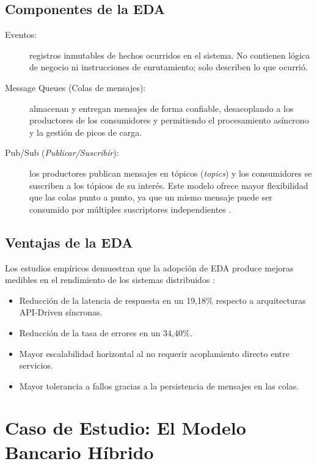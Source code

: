 \documentclass[12pt,a4paper]{article}
\begin{document}
\subsection{Componentes de la EDA}
 
\begin{description}
  \item[Eventos:] registros inmutables de hechos ocurridos en el sistema. No contienen lógica de negocio ni instrucciones de enrutamiento; solo describen lo que ocurrió.
  \item[Message Queues (Colas de mensajes):] almacenan y entregan mensajes de forma confiable, desacoplando a los productores de los consumidores y permitiendo el procesamiento asíncrono y la gestión de picos de carga.
  \item[Pub/Sub (\textit{Publicar/Suscribir}):] los productores publican mensajes en tópicos (\textit{topics}) y los consumidores se suscriben a los tópicos de su interés. Este modelo ofrece mayor flexibilidad que las colas punto a punto, ya que un mismo mensaje puede ser consumido por múltiples suscriptores independientes \cite{ref22}.
\end{description}
 
\subsection{Ventajas de la EDA}
 
Los estudios empíricos demuestran que la adopción de EDA produce mejoras medibles en el rendimiento de los sistemas distribuidos \cite{ref21}:
 
\begin{itemize}
  \item Reducción de la latencia de respuesta en un 19,18\% respecto a arquitecturas API-Driven síncronas.
  \item Reducción de la tasa de errores en un 34,40\%.
  \item Mayor escalabilidad horizontal al no requerir acoplamiento directo entre servicios.
  \item Mayor tolerancia a fallos gracias a la persistencia de mensajes en las colas.
\end{itemize}
 
\section{Caso de Estudio: El Modelo Bancario Híbrido}
 
\end{document}
